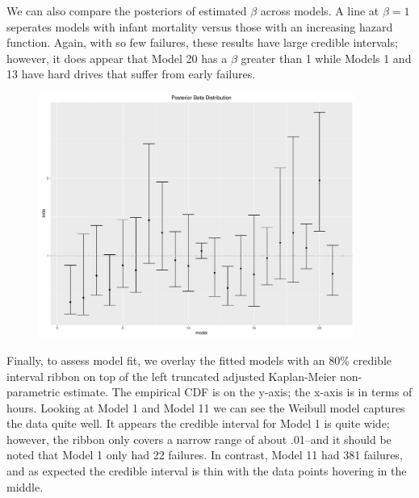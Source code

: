 \documentclass{scrartcl}
\begin{document}
\noindent We can also compare the posteriors of estimated $\beta$ across models.  A line at $\beta=1$ seperates models with infant mortality versus those with an increasing hazard function.  Again, with so few failures, these results have large credible intervals; however, it does appear that Model 20 has a $\beta$ greater than 1 while Models 1 and 13 have hard drives that suffer from early failures.
\begin{figure}[H]
\centering
\includegraphics[height=8cm]{postbeta.pdf}
\end{figure}

\noindent Finally, to assess model fit, we overlay the fitted models with an 80\% credible interval ribbon on top of the left truncated adjusted Kaplan-Meier non-parametric estimate.  The empirical CDF is on the y-axis; the x-axis is in terms of hours.  Looking at Model 1 and Model 11 we can see the Weibull model captures the data quite well.  It appears the credible interval for Model 1 is quite wide; however, the ribbon only covers a narrow range of about .01--and it should be noted that Model 1 only had 22 failures.  In contrast, Model 11 had 381 failures, and as expected the credible interval is thin with the data points hovering in the middle.
\end{document}
